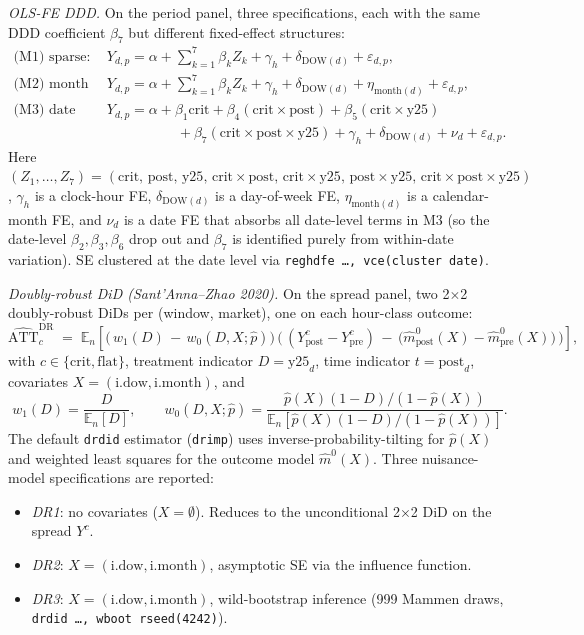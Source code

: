 \documentclass[11pt,a4paper]{article}
\begin{document}
\textit{OLS-FE DDD.} On the period panel, three specifications, each with the same DDD coefficient $\beta_7$ but different fixed-effect structures:
\begin{align*}
\text{(M1) sparse:}\quad & Y_{d,p} = \alpha + \sum_{k=1}^{7} \beta_k Z_k + \gamma_h + \delta_{\text{DOW}(d)} + \varepsilon_{d,p}, \\
\text{(M2) month FE:}\quad & Y_{d,p} = \alpha + \sum_{k=1}^{7} \beta_k Z_k + \gamma_h + \delta_{\text{DOW}(d)} + \eta_{\text{month}(d)} + \varepsilon_{d,p}, \\
\text{(M3) date FE:}\quad & Y_{d,p} = \alpha + \beta_1 \text{crit} + \beta_4 (\text{crit}\!\times\!\text{post}) + \beta_5 (\text{crit}\!\times\!\text{y25}) \\
& \qquad\qquad\quad + \beta_7 (\text{crit}\!\times\!\text{post}\!\times\!\text{y25}) + \gamma_h + \delta_{\text{DOW}(d)} + \nu_d + \varepsilon_{d,p}.
\end{align*}
Here $(Z_1,\ldots,Z_7) = (\text{crit},\,\text{post},\,\text{y25},\,\text{crit}\!\times\!\text{post},\,\text{crit}\!\times\!\text{y25},\,\text{post}\!\times\!\text{y25},\,\text{crit}\!\times\!\text{post}\!\times\!\text{y25})$, $\gamma_h$ is a clock-hour FE, $\delta_{\text{DOW}(d)}$ is a day-of-week FE, $\eta_{\text{month}(d)}$ is a calendar-month FE, and $\nu_d$ is a date FE that absorbs all date-level terms in M3 (so the date-level $\beta_2,\beta_3,\beta_6$ drop out and $\beta_7$ is identified purely from within-date variation). SE clustered at the date level via \texttt{reghdfe \ldots, vce(cluster date)}.

\textit{Doubly-robust DiD (Sant'Anna--Zhao 2020).} On the spread panel, two 2$\times$2 doubly-robust DiDs per (window, market), one on each hour-class outcome:
\[
\widehat{\text{ATT}}^{\text{DR}}_{c} \;=\; \mathbb{E}_n\!\left[\Big(\,w_{1}(D)\,-\,w_{0}(D,X;\hat p)\Big)\,\Big(\,(Y^{c}_{\text{post}}-Y^{c}_{\text{pre}})\,-\,\big(\hat m^{0}_{\text{post}}(X)-\hat m^{0}_{\text{pre}}(X)\big)\,\Big)\right],
\]
with $c \in \{\text{crit}, \text{flat}\}$, treatment indicator $D = \text{y25}_d$, time indicator $t = \text{post}_d$, covariates $X = (\text{i.dow}, \text{i.month})$, and
\[
w_{1}(D) = \frac{D}{\mathbb{E}_n[D]}, \qquad
w_{0}(D, X; \hat p) = \frac{\hat p(X)(1-D)/(1-\hat p(X))}{\mathbb{E}_n[\hat p(X)(1-D)/(1-\hat p(X))]}.
\]
The default \texttt{drdid} estimator (\texttt{drimp}) uses inverse-probability-tilting for $\hat p(X)$ and weighted least squares for the outcome model $\hat m^{0}(X)$. Three nuisance-model specifications are reported:
\begin{itemize}
\item \emph{DR1}: no covariates ($X = \emptyset$). Reduces to the unconditional 2$\times$2 DiD on the spread $Y^{c}$.
\item \emph{DR2}: $X = (\text{i.dow}, \text{i.month})$, asymptotic SE via the influence function.
\item \emph{DR3}: $X = (\text{i.dow}, \text{i.month})$, wild-bootstrap inference (999 Mammen draws, \texttt{drdid \ldots, wboot rseed(4242)}).
\end{itemize}
\end{document}
